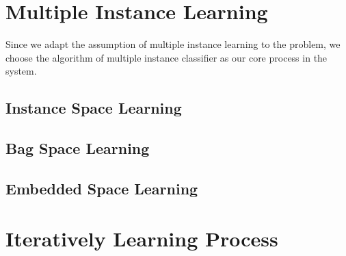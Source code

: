 
\section{Multiple Instance Learning}
\label{sec:method_mil}
Since we adapt the assumption of multiple instance learning to the problem, we choose the algorithm of multiple instance classifier as our core process in the system.

\subsection{Instance Space Learning}
\subsection{Bag Space Learning}
\subsection{Embedded Space Learning}


\section{Iteratively Learning Process}
\label{sec:method_iterate}


